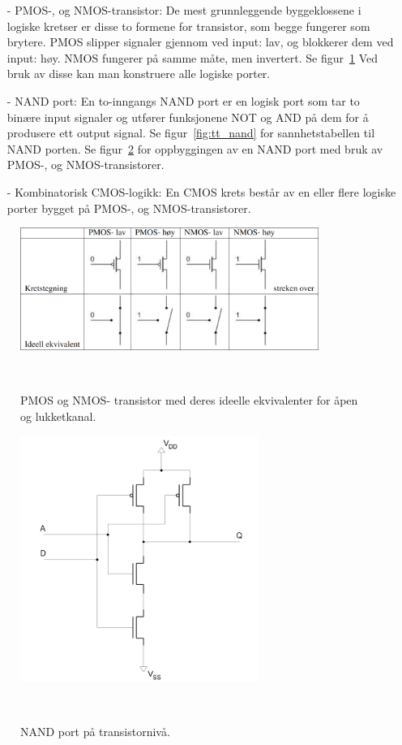     \begin{itemize}
        \item[-] PMOS-, og NMOS-transistor: De mest grunnleggende byggeklossene i logiske kretser er disse to formene for transistor, som begge fungerer som brytere.
        PMOS slipper signaler gjennom ved input: lav, og blokkerer dem ved input: høy.
        NMOS fungerer på samme måte, men invertert.
        Se figur~\ref{fig:pnmos_transistors} Ved bruk av disse kan man konstruere alle logiske porter.
        \item[-] NAND port: En to-inngangs NAND port er en logisk port som tar to binære input signaler og utfører funksjonene NOT og AND på dem for å produsere ett output signal.
        Se figur~\ref{fig:tt_nand} for sannhetstabellen til NAND porten.
        Se figur~\ref{fig:NAND_transistorlevel} for oppbyggingen av en NAND port med bruk av PMOS-, og NMOS-transistorer.
        \item[-] Kombinatorisk CMOS-logikk: En CMOS krets består av en eller flere logiske porter bygget på PMOS-, og NMOS-transistorer.
    \end{itemize}

    \begin{figure}[!htb]
        \centering
        \includegraphics[height=4cm]{figurer/PNMOS.png}
        \caption{PMOS og NMOS- transistor med deres ideelle ekvivalenter for åpen og lukketkanal.}
        \label{fig:pnmos_transistors}
        ~\cite{labhefte}
    \end{figure}

    \begin{figure}[!htb]
        \centering
        \includegraphics[height=8cm]{figurer/NAND_transistorlevel.png}
        \caption{NAND port på transistornivå.}
        \label{fig:NAND_transistorlevel}
        ~\cite{labhefte}
    \end{figure}

